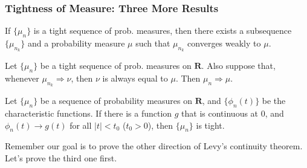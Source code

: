\documentclass[handout]{beamer}
\begin{document}
%
% 
% 
% 
% 


\frame
{
  \frametitle{Tightness of Measure: Three More Results }

\begin{theorem}[11.1.10]
 If $\{\mu_n\}$ is a tight sequence of prob. measures, then there exists a subsequence $\{\mu_{n_k}\}$ and a probability measure $\mu$ such that $\mu_{n_k}$ converges weakly to $\mu$. 
 \end{theorem}
 
\begin{theorem}[Corollary 11.1.11]
 Let $\{\mu_n\}$ be a tight sequence of prob. measures on $\mathbf{R}$. Also suppose that, whenever $\mu_{n_k} \Rightarrow \nu$, then $\nu$ is always equal to $\mu$. Then $\mu_n \Rightarrow \mu$.
 \end{theorem}

\begin{Lemma}[11.1.13]
 Let $\{\mu_n\}$ be a sequence of probability measures on $\mathbf{R}$, and $\{\phi_n(t)\}$ be the characteristic functions. If there is a function $g$ that is continuous at 0, and $\phi_n(t)\rightarrow g(t)$ for all $|t|<t_0$ ($t_0>0$), then $\{\mu_n\}$ is tight. 
 \end{Lemma}

Remember our goal is to prove the other direction of Levy's continuity theorem. Let's prove the third one first.

}
\end{document}

